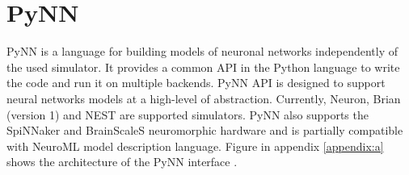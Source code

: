 \section{PyNN}
PyNN is a language for building models of neuronal networks independently of the used simulator. It provides a common API in the Python language to write the code and run it on multiple backends. PyNN API is designed to support neural networks models at a high-level of abstraction. Currently, Neuron, Brian (version 1) and NEST are supported simulators. PyNN also supports the SpiNNaker and BrainScaleS neuromorphic hardware and is partially compatible with NeuroML model description language. Figure in appendix \ref{appendix:a} shows the architecture of the PyNN interface \cite{bruderleNeuroscientificModelingMixedSignal2009}.